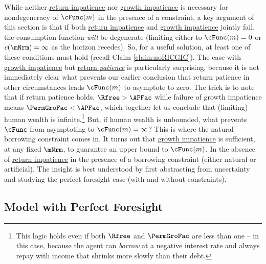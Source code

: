 \documentclass[BufferStockTheory]{subfiles}
\begin{document}
While neither \hyperlink{RIC}{return impatience} nor \hyperlink{GIC}{growth impatience} is necessary for nondegeneracy of $\cFunc(m)$ in the presence of a constraint, a key argument of this section is that if both \hyperlink{RIC}{return impatience} and \hyperlink{GIC}{growth impatience} jointly fail, the consumption function \emph{will} be degenerate (limiting either to $\cFunc(m)=0$ or $c(\mNrm)=\infty$ as the horizon recedes). So, for a useful solution, at least one of these conditions must hold (recall Claim \ref{claim:noRICGIC}). The case with \hyperlink{GIC}{growth impatience} but \hyperlink{RIC}{return \emph{patience}} is particularly surprising, because it is not immediately clear what prevents our earlier conclusion that return patience in other circumstances leads $\cFunc(m)$ to asymptote to zero.  The trick is to note that if return patience holds, $\Rfree > \APFac$ while failure of growth impatience means $\PermGroFac < \APFac$, which together let us conclude that (limiting) human wealth is infinite.\footnote{This logic holds even if both $\Rfree$ and $\PermGroFac$ are less than one -- in this case, because the agent can \emph{borrow} at a negative interest rate and always repay with income that shrinks more slowly than their debt.}  But, if human wealth is unbounded, what prevents $\cFunc$ from asymptoting to $\cFunc(m)=\infty$?  This is where the natural borrowing constraint comes in.  It turns out that \hyperlink{GIC}{growth impatience} is sufficient, at any fixed $\mNrm$, to guarantee an upper bound to $\cFunc(m)$.  In the absence of \hyperlink{RIC}{return impatience} in the presence of a borrowing constraint (either natural or artificial).  The insight is best understood by first abstracting from uncertainty and studying the perfect foresight case (with and without constraints).

\subsection{Model with Perfect Foresight}\label{subsec:PFBdiscussion}

\begin{comment}
Should we define the unconstrained problem?
\end{comment}

\hypertarget{ValuePFAnalytical}{}
\hypertarget{Autarky-Value-PF}{}

\end{document}
